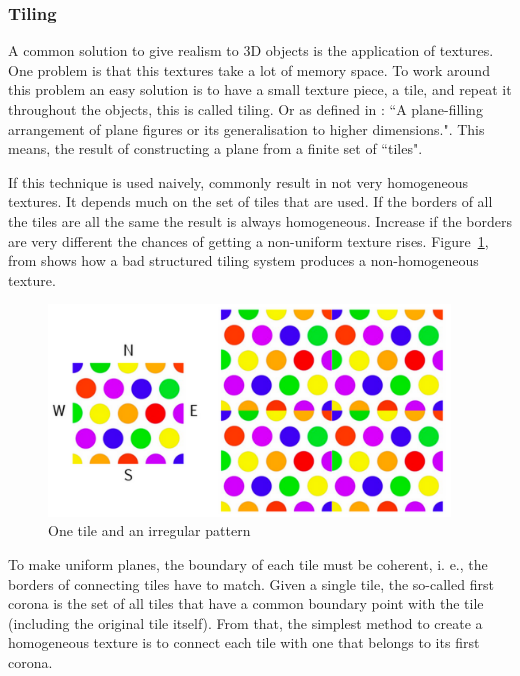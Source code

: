 
\subsubsection{Tiling} %
\label{ssub:tiling}

A common solution to give realism to 3D objects is the application of textures. One problem is that this textures take a lot of memory space. To work around this problem an easy solution is to have a small texture piece, a tile, and repeat it throughout the objects, this is called tiling. Or as defined in \cite{TilingWOLFRAM}: ``A plane-filling arrangement of plane figures or its generalisation to higher dimensions.".  This means, the result of constructing a plane from a finite set of ``tiles". 

If this technique is used naively, commonly result in not very homogeneous textures. It depends much on the set of tiles that are used. If the borders of all the tiles are all the same the result is always homogeneous. Increase if the borders are very different the chances of getting a non-uniform texture rises. Figure~\ref{fig:TIrregulartexture}, from \cite{ProcWorld} shows how a bad structured tiling system produces a non-homogeneous texture.  


\begin{figure}[htbp]
	\centering
	\includegraphics[width=0.95\textwidth]{img/Theory/Tiling/iregular.png}
	\caption{One tile and an irregular pattern}
	\label{fig:TIrregulartexture}
\end{figure}


To make uniform planes, the boundary of each tile must be coherent, i. e., the borders of connecting tiles have to match. Given a single tile, the so-called first corona is the set of all tiles that have a common boundary point with the tile (including the original tile itself). From that, the simplest method to create a homogeneous texture is to connect each tile with one that belongs to its first corona.

